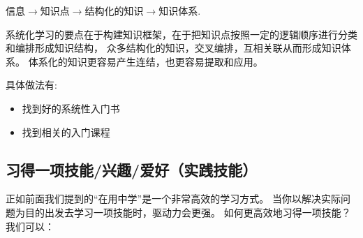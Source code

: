 \documentclass[../main.tex]{subfiles}
\begin{document}
信息$ \rightarrow $知识点$ \rightarrow $结构化的知识$ \rightarrow $知识体系.

系统化学习的要点在于构建知识框架，在于把知识点按照一定的逻辑顺序进行分类和编排形成知识结构，
众多结构化的知识，交叉编排，互相关联从而形成知识体系。
体系化的知识更容易产生连结，也更容易提取和应用。

具体做法有:
\begin{itemize}
  \item 找到好的系统性入门书
  \item 找到相关的入门课程
\end{itemize}
%
\subsection{习得一项技能/兴趣/爱好（实践技能）}
正如前面我们提到的``在用中学''是一个非常高效的学习方式。
当你以解决实际问题为目的出发去学习一项技能时，驱动力会更强。
如何更高效地习得一项技能？我们可以：
\\
\end{document}
